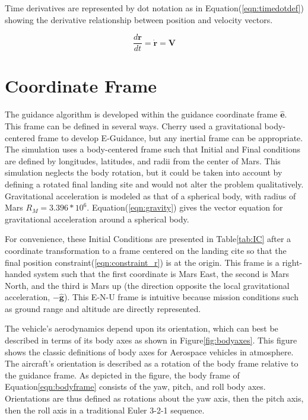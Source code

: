 Time derivatives are represented by dot notation as in Equation\:(\ref{eqn:timedotdef}) showing the derivative relationship between position and velocity vectors.

\begin{equation}
\label{eqn:timedotdef}
\frac{d\bm{r}}{dt} = \dot{\bm{r}} = \bm{V}
\end{equation}


\section{Coordinate Frame}
The guidance algorithm is developed within the guidance coordinate frame $\bm{\hat{e}}$. This frame can be defined in several ways. Cherry\:\cite{CHERRY} used a gravitational body-centered frame to develop E-Guidance, but any inertial frame can be appropriate. The simulation uses a body-centered frame such that Initial and Final conditions are defined by longitudes, latitudes, and radii from the center of Mars. This simulation neglects the body rotation, but it could be taken into account by defining a rotated final landing site and would not alter the problem qualitatively. Gravitational acceleration is modeled as that of a spherical body, with radius of Mars $R_M = 3.396*10^6$. Equation\:(\ref{eqn:gravity}) gives the vector equation for gravitational acceleration around a spherical body.

For convenience, these Initial Conditions are presented in Table\:\ref{tab:IC} after a coordinate transformation to a frame centered on the landing cite so that the final position constraint\:(\ref{eqn:constraint_r}) is at the origin. This frame is a right-handed system such that the first coordinate is Mars East, the second is Mars North, and the third is Mars up (the direction opposite the local gravitational acceleration, $-\hat{\bm{g}}$). This E-N-U frame is intuitive because mission conditions such as ground range and altitude are directly represented.  

The vehicle's aerodynamics depend upon its orientation, which can best be described in terms of its body axes as shown in Figure\:\ref{fig:bodyaxes}. This figure shows the classic definitions of body axes for Aerospace vehicles in atmosphere. The aircraft's orientation is described as a rotation of the body frame relative to the guidance frame. As depicted in the figure, the body frame of Equation\:\ref{eqn:bodyframe} consists of the yaw, pitch, and roll body axes. Orientations are thus defined as rotations about the yaw axis, then the pitch axis, then the roll axis in a traditional Euler 3-2-1 sequence.

